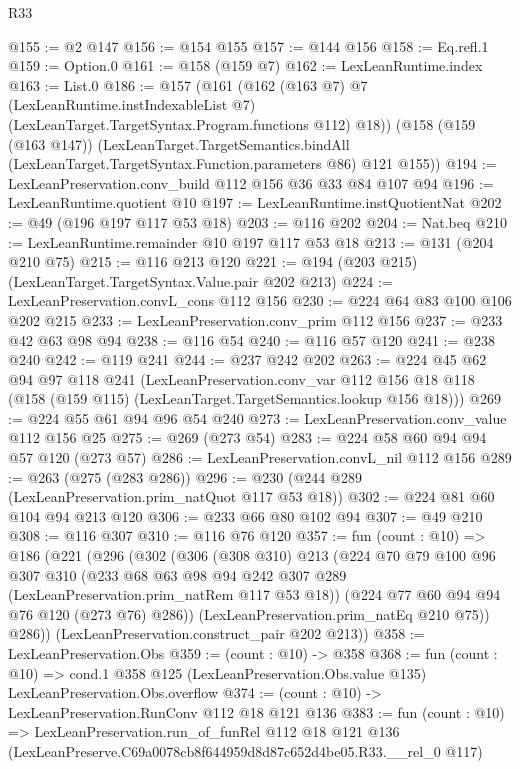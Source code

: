 \begin{lexlean}{R33}
\begin{coremodule}
@155 := @2 @147
@156 := @154 @155
@157 := @144 @156
@158 := Eq.refl.{1}
@159 := Option.{0}
@161 := @158 (@159 @7)
@162 := LexLeanRuntime.index
@163 := List.{0}
@186 := @157
    (@161
      (@162
        (@163 @7)
        @7
        (LexLeanRuntime.instIndexableList @7)
        (LexLeanTarget.TargetSyntax.Program.functions @112)
        @18))
    (@158
      (@159 (@163 @147))
      (LexLeanTarget.TargetSemantics.bindAll
        (LexLeanTarget.TargetSyntax.Function.parameters @86)
        @121
        @155))
@194 := LexLeanPreservation.conv_build @112 @156 @36 @33 @84 @107 @94
@196 := LexLeanRuntime.quotient @10
@197 := LexLeanRuntime.instQuotientNat
@202 := @49 (@196 @197 @117 @53 @18)
@203 := @116 @202
@204 := Nat.beq
@210 := LexLeanRuntime.remainder @10 @197 @117 @53 @18
@213 := @131 (@204 @210 @75)
@215 := @116 @213 @120
@221 := @194 (@203 @215) (LexLeanTarget.TargetSyntax.Value.pair @202 @213)
@224 := LexLeanPreservation.convL_cons @112 @156
@230 := @224 @64 @83 @100 @106 @202 @215
@233 := LexLeanPreservation.conv_prim @112 @156
@237 := @233 @42 @63 @98 @94
@238 := @116 @54
@240 := @116 @57 @120
@241 := @238 @240
@242 := @119 @241
@244 := @237 @242 @202
@263 := @224
    @45
    @62
    @94
    @97
    @118
    @241
    (LexLeanPreservation.conv_var
      @112
      @156
      @18
      @118
      (@158 (@159 @115) (LexLeanTarget.TargetSemantics.lookup @156 @18)))
@269 := @224 @55 @61 @94 @96 @54 @240
@273 := LexLeanPreservation.conv_value @112 @156 @25
@275 := @269 (@273 @54)
@283 := @224 @58 @60 @94 @94 @57 @120 (@273 @57)
@286 := LexLeanPreservation.convL_nil @112 @156
@289 := @263 (@275 (@283 @286))
@296 := @230 (@244 @289 (LexLeanPreservation.prim_natQuot @117 @53 @18))
@302 := @224 @81 @60 @104 @94 @213 @120
@306 := @233 @66 @80 @102 @94
@307 := @49 @210
@308 := @116 @307
@310 := @116 @76 @120
@357 := fun (count : @10) =>
  @186
    (@221
      (@296
        (@302
          (@306
            (@308 @310)
            @213
            (@224
              @70
              @79
              @100
              @96
              @307
              @310
              (@233 @68 @63 @98 @94 @242 @307 @289 (LexLeanPreservation.prim_natRem @117 @53 @18))
              (@224 @77 @60 @94 @94 @76 @120 (@273 @76) @286))
            (LexLeanPreservation.prim_natEq @210 @75))
          @286))
      (LexLeanPreservation.construct_pair @202 @213))
@358 := LexLeanPreservation.Obs
@359 := (count : @10) -> @358
@368 := fun (count : @10) =>
  cond.{1} @358 @125 (LexLeanPreservation.Obs.value @135) LexLeanPreservation.Obs.overflow
@374 := (count : @10) -> LexLeanPreservation.RunConv @112 @18 @121 @136
@383 := fun (count : @10) =>
  LexLeanPreservation.run_of_funRel
    @112
    @18
    @121
    @136
    (LexLeanPreserve.C69a0078cb8f644959d8d87c652d4be05.R33.__rel_0 @117)
\end{coremodule}
\end{lexlean}
